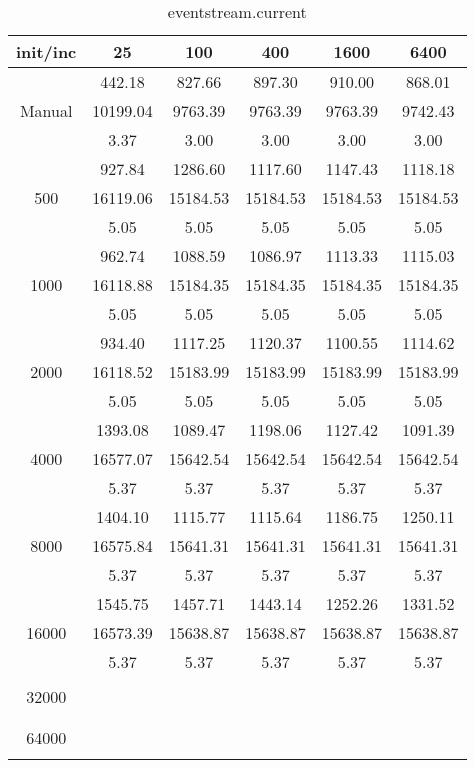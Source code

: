 \begin{table}[th]
\caption{eventstream.current}
\label{tab:eventstream.current}
\centering
\begin{tabular}{|c||c|c|c|c|c|}
\hline
init/inc & 25 & 100 & 400 & 1600 & 6400 \\ \hline \hline
       & 442.18  &  827.66  & 897.30  & 910.00 & 868.01 \\
Manual & 10199.04 & 9763.39 & 9763.39 & 9763.39 & 9742.43 \\
       & 3.37     & 3.00    & 3.00    & 3.00    & 3.00 \\ \hline
  & 927.84 & 1286.60 & 1117.60 & 1147.43 & 1118.18\\ 
500  & 16119.06 & 15184.53 & 15184.53 & 15184.53 & 15184.53\\ 
  & 5.05 & 5.05 & 5.05 & 5.05 & 5.05\\ \hline 
  & 962.74 & 1088.59 & 1086.97 & 1113.33 & 1115.03\\ 
1000  & 16118.88 & 15184.35 & 15184.35 & 15184.35 & 15184.35\\ 
  & 5.05 & 5.05 & 5.05 & 5.05 & 5.05\\ \hline 
  & 934.40 & 1117.25 & 1120.37 & 1100.55 & 1114.62\\ 
2000  & 16118.52 & 15183.99 & 15183.99 & 15183.99 & 15183.99\\ 
  & 5.05 & 5.05 & 5.05 & 5.05 & 5.05\\ \hline 
  & 1393.08 & 1089.47 & 1198.06 & 1127.42 & 1091.39\\ 
4000  & 16577.07 & 15642.54 & 15642.54 & 15642.54 & 15642.54\\ 
  & 5.37 & 5.37 & 5.37 & 5.37 & 5.37\\ \hline 
  & 1404.10 & 1115.77 & 1115.64 & 1186.75 & 1250.11\\ 
8000  & 16575.84 & 15641.31 & 15641.31 & 15641.31 & 15641.31\\ 
  & 5.37 & 5.37 & 5.37 & 5.37 & 5.37\\ \hline 
  & 1545.75 & 1457.71 & 1443.14 & 1252.26 & 1331.52\\ 
16000  & 16573.39 & 15638.87 & 15638.87 & 15638.87 & 15638.87\\ 
  & 5.37 & 5.37 & 5.37 & 5.37 & 5.37\\ \hline 
  &  &  &  &  & \\ 
32000  &  &  &  &  & \\ 
  &  &  &  &  & \\ \hline 
  &  &  &  &  & \\ 
64000  &  &  &  &  & \\ 
  &  &  &  &  & \\ \hline 
\end{tabular}
\end{table}

